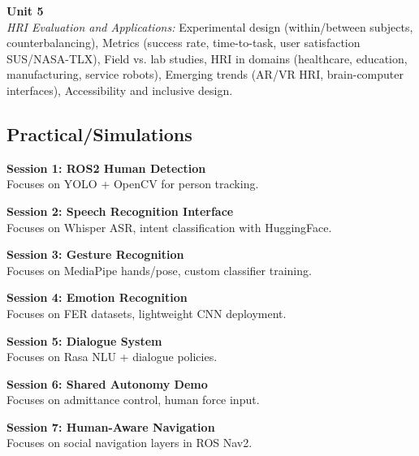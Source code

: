 \vspace{0.3cm}

\noindent\textbf{Unit 5} \\
\textit{HRI Evaluation and Applications:} Experimental design (within/between subjects, counterbalancing), Metrics (success rate, time-to-task, user satisfaction SUS/NASA-TLX), Field vs. lab studies, HRI in domains (healthcare, education, manufacturing, service robots), Emerging trends (AR/VR HRI, brain-computer interfaces), Accessibility and inclusive design.

\newpage

\subsection*{Practical/Simulations}
\noindent\textbf{Session 1: ROS2 Human Detection} \\
Focuses on YOLO + OpenCV for person tracking.

\vspace{0.2cm}

\noindent\textbf{Session 2: Speech Recognition Interface} \\
Focuses on Whisper ASR, intent classification with HuggingFace.

\vspace{0.2cm}

\noindent\textbf{Session 3: Gesture Recognition} \\
Focuses on MediaPipe hands/pose, custom classifier training.

\vspace{0.2cm}

\noindent\textbf{Session 4: Emotion Recognition} \\
Focuses on FER datasets, lightweight CNN deployment.

\vspace{0.2cm}

\noindent\textbf{Session 5: Dialogue System} \\
Focuses on Rasa NLU + dialogue policies.

\vspace{0.2cm}

\noindent\textbf{Session 6: Shared Autonomy Demo} \\
Focuses on admittance control, human force input.

\vspace{0.2cm}

\noindent\textbf{Session 7: Human-Aware Navigation} \\
Focuses on social navigation layers in ROS Nav2.


